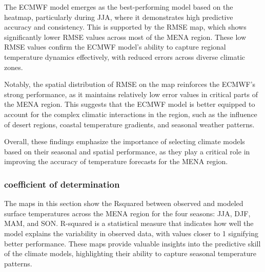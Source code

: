 The ECMWF model emerges as the best-performing model based on the heatmap, particularly during JJA, where it demonstrates high predictive accuracy and consistency. This is supported by the RMSE map, which shows significantly lower RMSE values across most of the MENA region. These low RMSE values confirm the ECMWF model's ability to capture regional temperature dynamics effectively, with reduced errors across diverse climatic zones.

Notably, the spatial distribution of RMSE on the map reinforces the ECMWF's strong performance, as it maintains relatively low error values in critical parts of the MENA region. This suggests that the ECMWF model is better equipped to account for the complex climatic interactions in the region, such as the influence of desert regions, coastal temperature gradients, and seasonal weather patterns.

Overall, these findings emphasize the importance of selecting climate models based on their seasonal and spatial performance, as they play a critical role in improving the accuracy of temperature forecasts for the MENA region.







\subsubsection{coefficient of determination}


The maps in this section show the Rsquared between observed and modeled surface temperatures across the MENA region for the four seasons: JJA, DJF, MAM, and SON. R-squared is a statistical measure that indicates how well the model explains the variability in observed data, with values closer to 1 signifying better performance. These maps provide valuable insights into the predictive skill of the climate models, highlighting their ability to capture seasonal temperature patterns.

